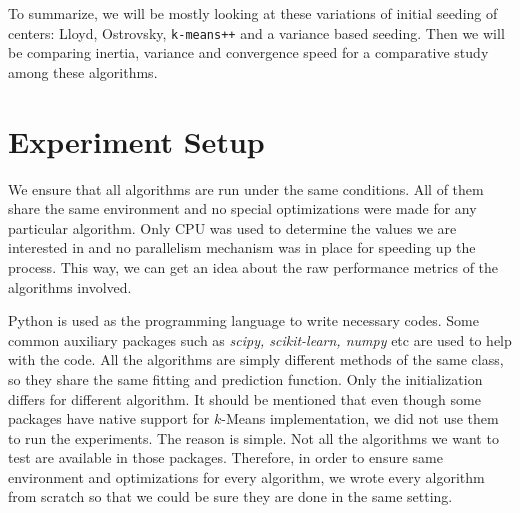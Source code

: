 \documentclass[10pt, leqno]{article}
\begin{document}
	To summarize, we will be mostly looking at these variations of initial seeding of centers: Lloyd, Ostrovsky, \texttt{k-means++} and a variance based seeding. Then we will be comparing inertia, variance and convergence speed for a comparative study among these algorithms.
	\section{Experiment Setup}
	We ensure that all algorithms are run under the same conditions. All of them share the same environment and no special optimizations were made for any particular algorithm. Only CPU was used to determine the values we are interested in and no parallelism mechanism was in place for speeding up the process. This way, we can get an idea about the raw performance metrics of the algorithms involved.
	
	Python is used as the programming language to write necessary codes. Some common auxiliary packages such as \textit{scipy, scikit-learn, numpy} etc are used to help with the code. All the algorithms are simply different methods of the same class, so they share the same fitting and prediction function. Only the initialization differs for different algorithm. It should be mentioned that even though some packages have native support for $k$-Means implementation, we did not use them to run the experiments. The reason is simple. Not all the algorithms we want to test are available in those packages. Therefore, in order to ensure same environment and optimizations for every algorithm, we wrote every algorithm from scratch so that we could be sure they are done in the same setting.
	
\end{document}
